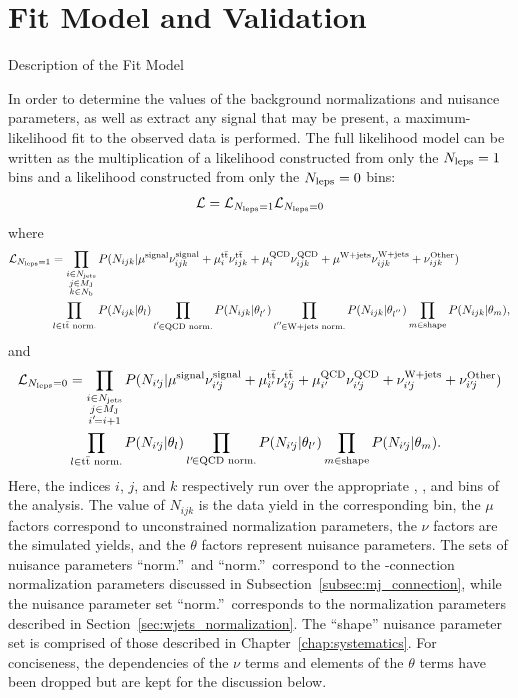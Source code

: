 \chapter{Fit Model and Validation}

\begin{section}{Description of the Fit Model}
\label{sec:fit_model}

In order to determine the values of the background normalizations and nuisance parameters, as well as extract any signal that may be present, a maximum-likelihood fit to the observed data is performed. 
The full likelihood model can be written as the multiplication of a likelihood constructed from only the $N_{\mathrm{leps}} = 1$ bins and a likelihood constructed from only the $N_{\mathrm{leps}} = 0$ bins:
\begin{align}
\mathcal{L} = \mathcal{L}_{N_{\mathrm{leps}} = 1} \mathcal{L}_{N_{\mathrm{leps}} = 0}
\end{align}
where
\begin{align}
\mathcal{L}_{\Nleps = 1}& = \prod_{\substack{i\in\Njets\\ j\in\MJ\\ k \in\Nb}}
P(N_{ijk}|\mu^{\signal}\nu^{\signal}_{ijk} + \mu^{\ttbar}_{i}\nu^{\ttbar}_{ijk} + \mu^{\QCD}_{i}\nu^{\QCD}_{ijk} + \mu^{\Wjets}\nu^{\Wjets}_{ijk} + \nu^{\Other}_{ijk}) \nonumber \\
                        &\prod_{l\in\text{\ttbar norm.}} P(N_{ijk}|\theta_{l}) \prod_{l^{'}\!\in\text{QCD norm.}} P(N_{ijk}|\theta_{l^{'}}) \prod_{l^{''}\!\in\text{W+jets norm.}} P(N_{ijk}|\theta_{l^{''}}) \prod_{m\in\text{shape}} P(N_{ijk}|\theta_{m}),
\end{align}
and 
\begin{align}
\mathcal{L}_{\Nleps = 0} &= \prod_{\substack{i\in\Njets\\ j\in\MJ\\ i'\!= i + 1}}
P(N_{i'\!j}|\mu^{\signal}\nu^{\signal}_{i'\!j} + \mu^{\ttbar}_{i'}\nu^{\ttbar}_{i'\!j} + \mu^{\QCD}_{i'}\nu^{\QCD}_{i'\!j} + \nu^{\Wjets}_{i'\!j} + \nu^{\Other}_{i'\!j}) \nonumber \\
                         &\prod_{l\in\text{\ttbar norm.}} P(N_{i'\!j}|\theta_{l}) \prod_{l'\!\in\text{QCD norm.}} P(N_{i'\!j}|\theta_{l'}) \prod_{m\in\text{shape}} P(N_{i'\!j}|\theta_{m}).
\end{align}
Here, the indices $i$, $j$, and $k$ respectively run over the appropriate \Njets, \MJ, and \Nb bins of the analysis.
The value of $N_{ijk}$ is the data yield in the corresponding bin, the $\mu$ factors correspond to unconstrained normalization parameters, the $\nu$ factors are the simulated yields, and the $\theta$ factors represent nuisance parameters.
The sets of nuisance parameters ``\ttbar norm.''\ and ``\QCD norm.''\ correspond to the \MJ-connection normalization parameters discussed in Subsection~\ref{subsec:mj_connection}, while the nuisance parameter set ``\Wjets norm.''\ corresponds to the normalization parameters described in Section~\ref{sec:wjets_normalization}. 
The ``shape'' nuisance parameter set is comprised of those described in Chapter~\ref{chap:systematics}.
For conciseness, the dependencies of the $\nu$ terms and elements of the $\theta$ terms have been dropped but are kept for the discussion below.


\end{section}
